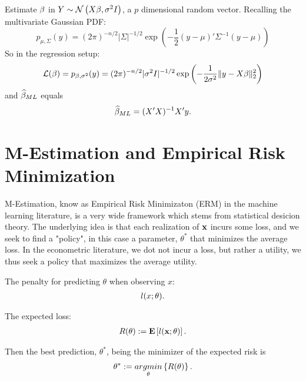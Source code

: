 \begin{example}

Estimate $\beta$ in $Y \sim \mathcal{N}\left(X\beta,\sigma^2 I\right)$, a $p$ dimensional random vector.
Recalling the multivariate Gaussian PDF:
$$
  p_{\mu,\Sigma}(y) = 
  (2 \pi)^{-n/2} |\Sigma|^{-1/2} \exp\left(
    -\frac{1}{2} (y-\mu)' \Sigma^{-1} (y-\mu)
  \right)
$$
So in the regression setup:
$$
  \mathcal{L}(\beta)= 
  p_{\beta,\sigma^2}(y) = 
  (2 \pi)^{-n/2} |\sigma^2 I|^{-1/2} \exp\left(
    -\frac{1}{2 \sigma^2} \Vert y-X\beta \Vert_2^2
  \right)
$$
and $\widehat{\beta}_{ML}$ equals 
\begin{align}
	\widehat{\beta}_{ML}=(X'X)^{-1} X'y.
\end{align}


\end{example}


\section{M-Estimation and Empirical Risk Minimization}
\label{sec:m_estimation}

M-Estimation, know as Empirical Risk Minimizaton (ERM) in the machine learning literature, is a very wide framework which stems from statistical desicion theory.
The underlying idea is that each realization of $\mathbf{x}$ incurs some loss, and we seek to find a "policy", in this case a parameter, $\theta^*$ that minimizes the average loss.
In the econometric literature, we dot not incur a loss, but rather a utility, we thus seek a policy that maximizes the average utility.

\begin{definition}
The penalty for predicting $\theta$ when observing $x$: 
\begin{align}
	l(x;\theta).
\end{align}

\end{definition}
\begin{definition}
The expected loss: 
\begin{align}
	R(\theta):=\mathbf{E}\left[ l(\mathbf{x};\theta) \right].
\end{align}

\end{definition}
Then the best prediction, $\theta^*$, being the minimizer of the expected risk is
\begin{align}
\label{eq:risk_min}
 \theta^*:= \mathop{argmin} _{\theta}\left\{ R(\theta) \right\}.
\end{align}

